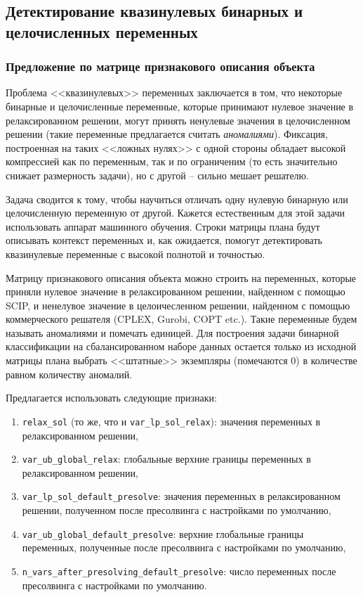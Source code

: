 \documentclass[%
	11pt,
	a4paper,
	utf8,
		]{article}
\begin{document}
\subsection{Детектирование квазинулевых бинарных и целочисленных переменных}

\subsubsection{Предложение по матрице признакового описания объекта}

Проблема <<квазинулевых>> переменных заключается в том, что некоторые бинарные и целочисленные переменные, которые принимают нулевое значение в релаксированном решении, могут принять ненулевые значения в целочисленном решении (такие переменные предлагается считать \emph{аномалиями}). Фиксация, построенная на таких <<ложных нулях>> с одной стороны обладает высокой компрессией как по переменным, так и по ограниченим (то есть значительно снижает размерность задачи), но с другой -- сильно мешает решателю.

Задача сводится к тому, чтобы научиться отличать одну нулевую бинарную или целочисленную переменную от другой. Кажется естественным для этой задачи использовать аппарат машинного обучения. Строки матрицы плана будут описывать контекст переменных и, как ожидается, помогут детектировать квазинулевые переменные с высокой полнотой и точностью.

Матрицу признакового описания объекта можно строить на переменных, которые приняли нулевое значение в релаксированном решении, найденном с помощью SCIP, и ненелувое значение в целоичесленном решении, найденном с помощью коммерческого решателя (CPLEX, Gurobi, COPT etc.). Такие переменные будем называть аномалиями и помечать единицей. Для построения задачи бинарной классификации на сбалансированном наборе данных остается только из исходной матрицы плана выбрать <<штатные>> экземпляры (помечаются 0) в количестве равном количеству аномалий.

Предлагается использовать следующие признаки:
\begin{enumerate}
	\item \verb|relax_sol| (то же, что и \verb|var_lp_sol_relax|): значения переменных в релаксированном решении,
	
	\item \verb|var_ub_global_relax|: глобальные верхние границы переменных в релаксированном решении,
	
	\item \verb|var_lp_sol_default_presolve|: значения переменных в релаксированном решении, полученном после пресолвинга с настройками по умолчанию,
	
	\item \verb|var_ub_global_default_presolve|: верхние глобальные границы переменных, полученные после пресолвинга с настройками по умолчанию,
	
	\item \verb|n_vars_after_presolving_default_presolve|: число переменных после пресолвинга с настройками по умолчанию.
\end{enumerate}
\end{document}
